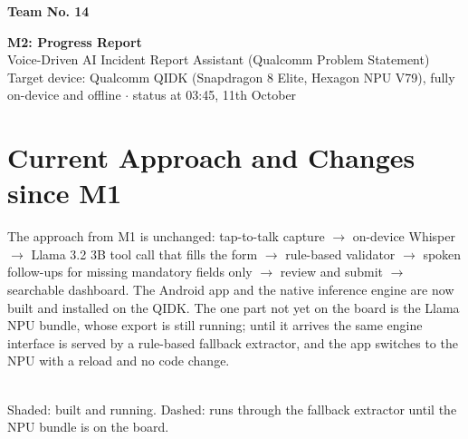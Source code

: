 \documentclass[9pt,a4paper]{extarticle}
\begin{document}
\textbf{Team No. 14}

\begin{center}
{\Large\bfseries M2: Progress Report}\\[2pt]
Voice-Driven AI Incident Report Assistant (Qualcomm Problem Statement)\\
{\small Target device: Qualcomm QIDK (Snapdragon 8 Elite, Hexagon NPU V79), fully on-device and offline \;$\cdot$\; status at 03:45, 11th October}
\end{center}

\section{Current Approach and Changes since M1}
The approach from M1 is unchanged: tap-to-talk capture $\rightarrow$ on-device Whisper $\rightarrow$ Llama 3.2 3B tool call that fills the form $\rightarrow$ rule-based validator $\rightarrow$ spoken follow-ups for missing mandatory fields only $\rightarrow$ review and submit $\rightarrow$ searchable dashboard. The Android app and the native inference engine are now built and installed on the QIDK. The one part not yet on the board is the Llama NPU bundle, whose export is still running; until it arrives the same engine interface is served by a rule-based fallback extractor, and the app switches to the NPU with a reload and no code change.

\begin{center}\small
{}\\[1pt]
{\scriptsize Shaded: built and running. Dashed: runs through the fallback extractor until the NPU bundle is on the board.}
\end{center}
\end{document}
